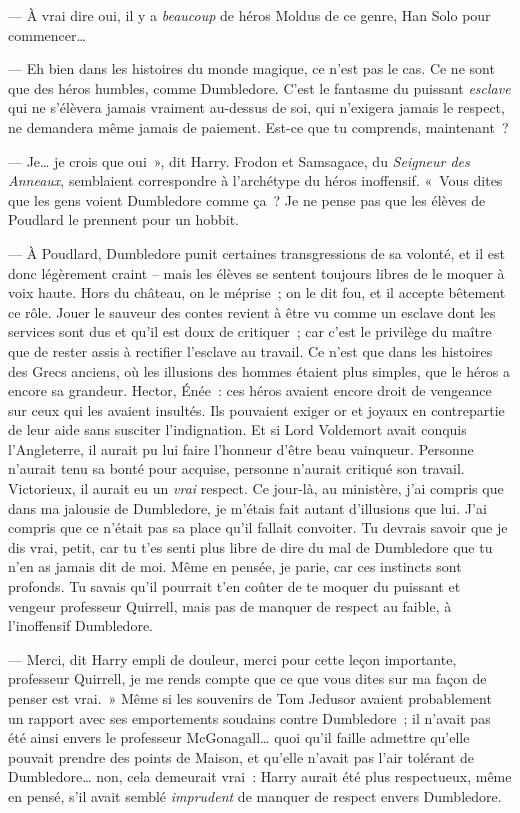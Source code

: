 --- À vrai dire oui, il y a \emph{beaucoup} de héros Moldus de ce genre, Han Solo pour commencer…

--- Eh bien dans les histoires du monde magique, ce n'est pas le cas.
Ce ne sont que des héros humbles, comme Dumbledore.
C'est le fantasme du puissant \emph{esclave} qui ne s'élèvera jamais vraiment au-dessus de soi, qui n'exigera jamais le respect, ne demandera même jamais de paiement.
Est-ce que tu comprends, maintenant~?

--- Je… je crois que oui~», dit Harry.
Frodon et Samsagace, du \emph{Seigneur des Anneaux}, semblaient correspondre à l'archétype du héros inoffensif.
«~Vous dites que les gens voient Dumbledore comme ça~?
Je ne pense pas que les élèves de Poudlard le prennent pour un hobbit.

--- À Poudlard, Dumbledore punit certaines transgressions de sa volonté, et il est donc légèrement craint -- mais les élèves se sentent toujours libres de le moquer à voix haute.
Hors du château, on le méprise~; on le dit fou, et il accepte bêtement ce rôle.
Jouer le sauveur des contes revient à être vu comme un esclave dont les services sont dus et qu'il est doux de critiquer~; car c'est le privilège du maître que de rester assis à rectifier l'esclave au travail.
Ce n'est que dans les histoires des Grecs anciens, où les illusions des hommes étaient plus simples, que le héros a encore sa grandeur.
Hector, Énée~: ces héros avaient encore droit de vengeance sur ceux qui les avaient insultés.
Ils pouvaient exiger or et joyaux en contrepartie de leur aide sans susciter l'indignation.
Et si Lord Voldemort avait conquis l'Angleterre, il aurait pu lui faire l'honneur d'être beau vainqueur.
Personne n'aurait tenu sa bonté pour acquise, personne n'aurait critiqué son travail.
Victorieux, il aurait eu un \emph{vrai} respect.
Ce jour-là, au ministère, j'ai compris que dans ma jalousie de Dumbledore, je m'étais fait autant d'illusions que lui.
J'ai compris que ce n'était pas sa place qu'il fallait convoiter.
Tu devrais savoir que je dis vrai, petit, car tu t'es senti plus libre de dire du mal de Dumbledore que tu n'en as jamais dit de moi.
Même en pensée, je parie, car ces instincts sont profonds.
Tu savais qu'il pourrait t'en coûter de te moquer du puissant et vengeur professeur Quirrell, mais pas de manquer de respect au faible, à l'inoffensif Dumbledore.

--- Merci, dit Harry empli de douleur, merci pour cette leçon importante, professeur Quirrell, je me rends compte que ce que vous dites sur ma façon de penser est vrai.~»
Même si les souvenirs de Tom Jedusor avaient probablement un rapport avec ses emportements soudains contre Dumbledore~; il n'avait pas été ainsi envers le professeur McGonagall… quoi qu'il faille admettre qu'elle pouvait prendre des points de Maison, et qu'elle n'avait pas l'air tolérant de Dumbledore… non, cela demeurait vrai~: Harry aurait été plus respectueux, même en pensé, s'il avait semblé \emph{imprudent} de manquer de respect envers Dumbledore.

